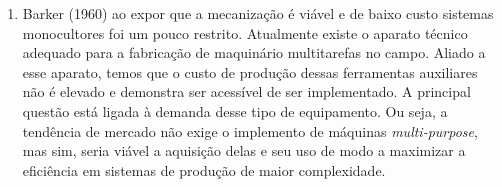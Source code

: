 \documentclass[a4paper, 12pt]{article}
\begin{document}
{\begin{enumerate}
		\item Barker (1960) ao expor que a mecanização é viável e de baixo custo sistemas monocultores foi um pouco restrito. Atualmente existe o aparato técnico adequado para a fabricação de maquinário multitarefas no campo. Aliado a esse aparato, temos que o custo de produção dessas ferramentas auxiliares não é elevado e demonstra ser acessível de ser implementado. A principal questão está ligada à demanda desse tipo de equipamento. Ou seja, a tendência de mercado não exige o implemento de máquinas \textit{multi-purpose}, mas sim, seria viável a aquisição delas e seu uso de modo a maximizar a eficiência em sistemas de produção de maior complexidade.
	\end{enumerate}
	}
\end{document}
